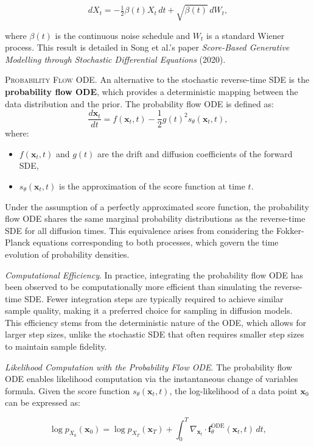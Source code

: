 \[
dX_t = -\tfrac{1}{2} \beta(t) X_t \, dt + \sqrt{\beta(t)} \, dW_t,
\]

\noindent where \( \beta(t) \) is the continuous noise schedule and \( W_t \) is a standard Wiener process. This result is detailed in Song et al.'s paper \textit{Score-Based Generative Modelling through Stochastic Differential Equations} (2020).

\textsc{Probability Flow ODE.} An alternative to the stochastic reverse-time SDE is the \textbf{probability flow ODE}, which provides a deterministic mapping between the data distribution and the prior. The probability flow ODE is defined as:
\[
\frac{d\mathbf{x}_t}{dt} = f(\mathbf{x}_t, t) - \frac{1}{2} g(t)^2 s_\theta(\mathbf{x}_t, t),
\]
where:
\begin{itemize}
    \item \( f(\mathbf{x}_t, t) \) and \( g(t) \) are the drift and diffusion coefficients of the forward SDE,
    \item \( s_\theta(\mathbf{x}_t, t) \) is the approximation of the score function at time \(t\).
\end{itemize}

Under the assumption of a perfectly approximated score function, the probability flow ODE shares the same marginal probability distributions as the reverse-time SDE for all diffusion times. This equivalence arises from considering the Fokker-Planck equations corresponding to both processes, which govern the time evolution of probability densities.

\textit{Computational Efficiency}. In practice, integrating the probability flow ODE has been observed to be computationally more efficient than simulating the reverse-time SDE. Fewer integration steps are typically required to achieve similar sample quality, making it a preferred choice for sampling in diffusion models. This efficiency stems from the deterministic nature of the ODE, which allows for larger step sizes, unlike the stochastic SDE that often requires smaller step sizes to maintain sample fidelity.

\textit{Likelihood Computation with the Probability Flow ODE}. The probability flow ODE enables likelihood computation via the instantaneous change of variables formula. Given the score function \( s_\theta(\mathbf{x}_t, t) \), the log-likelihood of a data point \( \mathbf{x}_0 \) can be expressed as:

\[
\log p_{X_0}(\mathbf{x}_0) = \log p_{X_T}(\mathbf{x}_T) + \int_0^T \nabla_{\mathbf{x}_t} \cdot \mathbf{f}_\theta^{\text{ODE}}(\mathbf{x}_t, t) \, dt,
\]

